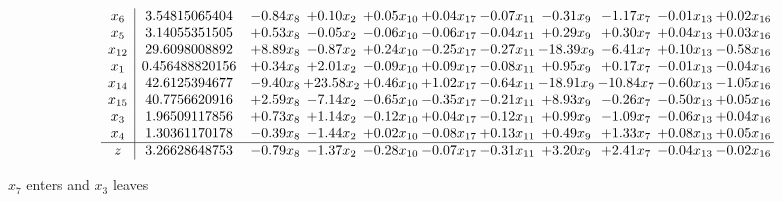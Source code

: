 \documentclass[9pt]{article}
\begin{document}
 \[\begin{array}{c| c c@{\hskip 2pt} c@{\hskip 2pt} c@{\hskip 2pt} c@{\hskip 2pt} c@{\hskip 2pt} c@{\hskip 2pt} c@{\hskip 2pt} c@{\hskip 2pt} c@{\hskip 2pt} }
 x_{6}   &  3.54815065404 & -0.84 x_{8} & +  0.10 x_{2} & +  0.05 x_{10} & +  0.04 x_{17} & -0.07 x_{11} & -0.31 x_{9} & -1.17 x_{7} & -0.01 x_{13} & +  0.02 x_{16}\\
 x_{5}   &  3.14055351505 & +  0.53 x_{8} & -0.05 x_{2} & -0.06 x_{10} & -0.06 x_{17} & -0.04 x_{11} & +  0.29 x_{9} & +  0.30 x_{7} & +  0.04 x_{13} & +  0.03 x_{16}\\
 x_{12}   &  29.6098008892 & +  8.89 x_{8} & -0.87 x_{2} & +  0.24 x_{10} & -0.25 x_{17} & -0.27 x_{11} & -18.39 x_{9} & -6.41 x_{7} & +  0.10 x_{13} & -0.58 x_{16}\\
 x_{1}   &  0.456488820156 & +  0.34 x_{8} & +  2.01 x_{2} & -0.09 x_{10} & +  0.09 x_{17} & -0.08 x_{11} & +  0.95 x_{9} & +  0.17 x_{7} & -0.01 x_{13} & -0.04 x_{16}\\
 x_{14}   &  42.6125394677 & -9.40 x_{8} & + 23.58 x_{2} & +  0.46 x_{10} & +  1.02 x_{17} & -0.64 x_{11} & -18.91 x_{9} & -10.84 x_{7} & -0.60 x_{13} & -1.05 x_{16}\\
 x_{15}   &  40.7756620916 & +  2.59 x_{8} & -7.14 x_{2} & -0.65 x_{10} & -0.35 x_{17} & -0.21 x_{11} & +  8.93 x_{9} & -0.26 x_{7} & -0.50 x_{13} & +  0.05 x_{16}\\
 x_{3}   &  1.96509117856 & +  0.73 x_{8} & +  1.14 x_{2} & -0.12 x_{10} & +  0.04 x_{17} & -0.12 x_{11} & +  0.99 x_{9} & -1.09 x_{7} & -0.06 x_{13} & +  0.04 x_{16}\\
 x_{4}   &  1.30361170178 & -0.39 x_{8} & -1.44 x_{2} & +  0.02 x_{10} & -0.08 x_{17} & +  0.13 x_{11} & +  0.49 x_{9} & +  1.33 x_{7} & +  0.08 x_{13} & +  0.05 x_{16}\\
\hline
z    &  3.26628648753 & -0.79 x_{8} & -1.37 x_{2} & -0.28 x_{10} & -0.07 x_{17} & -0.31 x_{11} & +  3.20 x_{9} & +  2.41 x_{7} & -0.04 x_{13} & -0.02 x_{16}\\
\end{array}\]


 $ x_{7} $ enters and $ x_{3} $ leaves 
\end{document}
